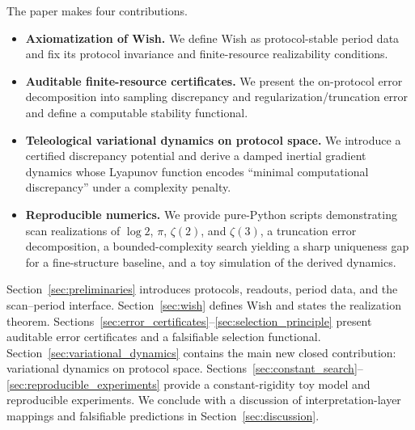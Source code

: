 The paper makes four contributions.
\begin{itemize}
\item \textbf{Axiomatization of Wish.} We define Wish as protocol-stable period data and fix its protocol invariance and finite-resource realizability conditions.
\item \textbf{Auditable finite-resource certificates.} We present the on-protocol error decomposition into sampling discrepancy and regularization/truncation error and define a computable stability functional.
\item \textbf{Teleological variational dynamics on protocol space.} We introduce a certified discrepancy potential and derive a damped inertial gradient dynamics whose Lyapunov function encodes ``minimal computational discrepancy'' under a complexity penalty.
\item \textbf{Reproducible numerics.} We provide pure-Python scripts demonstrating scan realizations of $\log 2$, $\pi$, $\zeta(2)$, and $\zeta(3)$, a truncation error decomposition, a bounded-complexity search yielding a sharp uniqueness gap for a fine-structure baseline, and a toy simulation of the derived dynamics.
\end{itemize}

Section~\ref{sec:preliminaries} introduces protocols, readouts, period data, and the scan--period interface.
Section~\ref{sec:wish} defines Wish and states the realization theorem.
Sections~\ref{sec:error_certificates}--\ref{sec:selection_principle} present auditable error certificates and a falsifiable selection functional.
Section~\ref{sec:variational_dynamics} contains the main new closed contribution: variational dynamics on protocol space.
Sections~\ref{sec:constant_search}--\ref{sec:reproducible_experiments} provide a constant-rigidity toy model and reproducible experiments.
We conclude with a discussion of interpretation-layer mappings and falsifiable predictions in Section~\ref{sec:discussion}.


